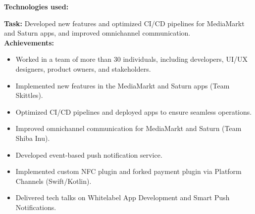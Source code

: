 \documentclass[10pt,a4paper,normalphoto]{altacv}
\begin{document}
\begin{fullwidth}
\textbf{Technologies used:}\\[0.4em]

\vspace{2em}

\textbf{Task:} Developed new features and optimized CI/CD pipelines for MediaMarkt and Saturn apps, and improved omnichannel communication.\\
\textbf{Achievements:}
\begin{itemize}
    \item Worked in a team of more than 30 individuals, including developers, UI/UX designers, product owners, and stakeholders.
    \item Implemented new features in the MediaMarkt and Saturn apps (Team Skittles).
    \item Optimized CI/CD pipelines and deployed apps to ensure seamless operations.
    \item Improved omnichannel communication for MediaMarkt and Saturn (Team Shiba Inu).
    \item Developed event-based push notification service.
    \item Implemented custom NFC plugin and forked payment plugin via Platform Channels (Swift/Kotlin).
    \item Delivered tech talks on Whitelabel App Development and Smart Push Notifications.
\end{itemize}


\end{fullwidth}
\end{document}

